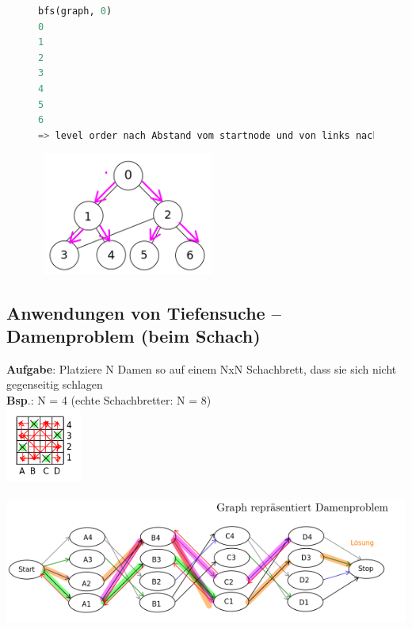 \documentclass[11pt, fleqn]{scrreprt}
\begin{document}
	\begin{figure}[htbp]
		\begin{minipage}[t]{11cm}
		\vspace{0cm}
			\begin{lstlisting}[language=Python]
bfs(graph, 0)
0
1
2
3
4
5
6
=> level order nach Abstand vom startnode und von links nach rechts
			\end{lstlisting}
		\end{minipage}
		\begin{minipage}[t]{6cm}
		\vspace{0.0cm}
		\includegraphics[width=6cm,height=4cm,keepaspectratio]{./Pictures/BFS.png}
		\end{minipage}
	\end{figure}

\newpage
	\subsection*{Anwendungen von Tiefensuche – Damenproblem (beim Schach)}
	\textbf{Aufgabe}: Platziere N Damen so auf einem NxN Schachbrett, dass sie sich nicht gegenseitig schlagen\\
	
	\textbf{Bsp}.: N = 4 \hspace*{1cm}(echte Schachbretter: N = 8)\\ \includegraphics[width=2.5cm,height=2.5cm,keepaspectratio]{./Pictures/Damenbrett.png}\\
	\includegraphics[width=14cm,height=5cm,keepaspectratio]{./Pictures/Damengraph.png}\\
	
\end{document}
